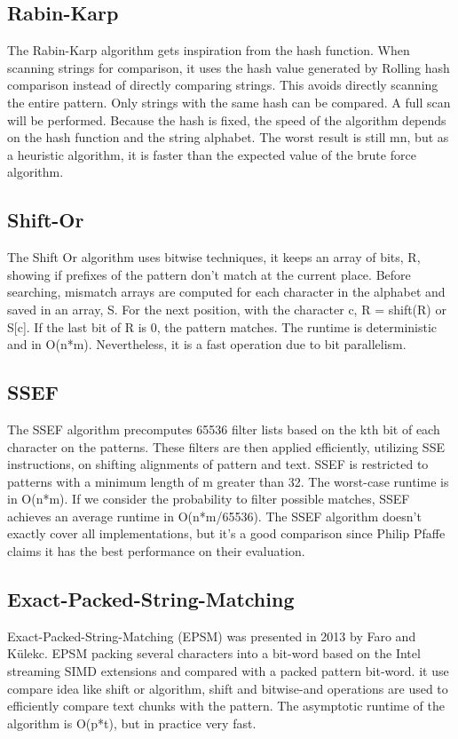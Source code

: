 \documentclass[11pt]{article}       %
\begin{document}
\subsection{Rabin-Karp}\label{rk}
The Rabin-Karp algorithm gets inspiration from the hash function. When scanning strings for comparison, it uses the hash value generated by Rolling hash comparison instead of directly comparing strings\cite{KR}. This avoids directly scanning the entire pattern. Only strings with the same hash can be compared. A full scan will be performed. Because the hash is fixed, the speed of the algorithm depends on the hash function and the string alphabet. The worst result is still mn, but as a heuristic algorithm, it is faster than the expected value of the brute force algorithm.

\subsection{Shift-Or}\label{so}
The Shift Or algorithm uses bitwise techniques\cite{Matching}, it keeps an array of bits, R, showing if prefixes of the pattern don't match at the current place. Before searching, mismatch arrays are computed for each character in the alphabet and saved in an array, S. For the next position, with the character c, R = shift(R) or S[c]. If the last bit of R is 0, the pattern matches. The runtime is deterministic and in O(n*m). Nevertheless, it is a fast operation due to bit parallelism.

\subsection{SSEF}\label{SSEF}
The SSEF algorithm precomputes 65536 filter lists based on the kth bit of each character on the patterns\cite{Matching}. These filters are then applied efficiently, utilizing SSE instructions, on shifting alignments of pattern and text. SSEF is restricted to patterns with a minimum length of m greater than 32. The worst-case runtime is in O(n*m). If we consider the probability to filter possible matches, SSEF achieves an average runtime in O(n*m/65536). The SSEF algorithm doesn't exactly cover all implementations, but it's a good comparison since Philip Pfaffe claims it has the best performance on their evaluation\cite{SSEF}.

\subsection{Exact-Packed-String-Matching}\label{EPSM}
Exact-Packed-String-Matching (EPSM) was presented in 2013 by Faro and Külekc\cite{EPSM}. EPSM packing several characters into a bit-word based on the Intel streaming SIMD extensions and compared with a packed pattern bit-word. it use compare idea like shift or algorithm, shift and bitwise-and operations are used to efficiently compare text chunks with the pattern. The asymptotic runtime of the algorithm is O(p*t), but in practice very fast.
\end{document}
